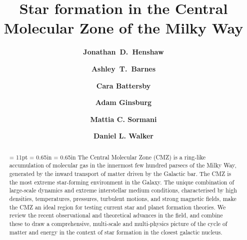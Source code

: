 \documentclass[preprint2]{pp7}
\begin{document}
    

\title{\textbf{\LARGE Star formation in the Central Molecular Zone of the Milky Way }}

\author {\textbf{\large Jonathan~D.~Henshaw}}
\author {\textbf{\large Ashley~T.~Barnes}}
\author {\textbf{\large Cara Battersby}}
\author {\textbf{\large Adam Ginsburg}}
\author {\textbf{\large Mattia C. Sormani}}
\author {\textbf{\large Daniel L. Walker}}

\begin{abstract}
\baselineskip = 11pt
\leftskip = 0.65in 
\rightskip = 0.65in
\parindent=1pc
 {\small The Central Molecular Zone (CMZ) is a ring-like accumulation of molecular gas in the innermost few hundred parsecs of the Milky Way, generated by the inward transport of matter driven by the Galactic bar. The CMZ is the most extreme star-forming environment in the Galaxy. The unique combination of large-scale dynamics and extreme interstellar medium conditions, characterised by high densities, temperatures, pressures, turbulent motions, and strong magnetic fields, make the CMZ an ideal region for testing current star and planet formation theories. 
We review the recent observational and theoretical advances in the field, and combine these to draw a comprehensive, multi-scale and multi-physics picture of the cycle of matter and energy in the context of star formation in the closest galactic nucleus.
 \\~\\~\\~}
\end{abstract}  
\end{document}
